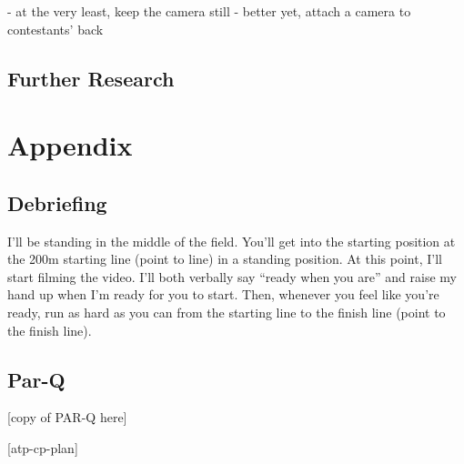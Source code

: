 \documentclass[index]{subfiles}
\begin{document}
- at the very least, keep the camera still
- better yet, attach a camera to contestants' back

\subsection{Further Research}

\section{Appendix}
\subsection{Debriefing}
I'll be standing in the middle of the field. You'll get into the starting position at the 200m starting line (point to line) in a standing position. At this point, I'll start filming the video. I'll both verbally say ``ready when you are'' and raise my hand up when I'm ready for you to start. Then, whenever you feel like you're ready, run as hard as you can from the starting line to the finish line (point to the finish line).
\subsection{Par-Q}
[copy of PAR-Q here]

[atp-cp-plan]

\raggedright{}
\printbibliography[heading=bibintoc]
\end{document}
